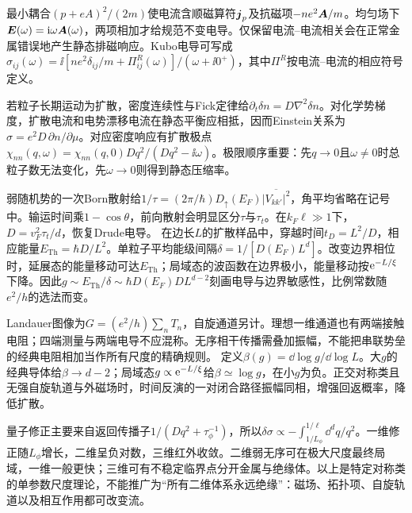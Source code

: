 \label{ch:disorder}
最小耦合$(p+eA)^2/(2m)$使电流含顺磁算符$\boldsymbol{j}_p$及抗磁项$-ne^2\boldsymbol{A}/m$。均匀场下$\boldsymbol{E}(\omega)=\mathrm i\omega\boldsymbol{A}(\omega)$，两项相加才给规范不变电导。仅保留电流--电流相关会在正常金属错误地产生静态排磁响应。Kubo电导可写成$\sigma_{ij}(\omega)=\ii[ne^2\delta_{ij}/m+\Pi^R_{ij}(\omega)]/(\omega+\ii0^+)$，其中$\Pi^R$按电流--电流的相应符号定义。

若粒子长期运动为扩散，密度连续性与Fick定律给$\partial_t\delta n=D\nabla^2\delta n$。对化学势梯度，扩散电流和电势漂移电流在静态平衡应相抵，因而Einstein关系为$\sigma=e^2D\,\partial n/\partial\mu$。对应密度响应有扩散极点$\chi_{nn}(q,\omega)=\chi_{nn}(q,0)Dq^2/(Dq^2-\ii\omega)$。极限顺序重要：先$q\to0$且$\omega\ne0$时总粒子数无法变化，先$\omega\to0$则得到静态压缩率。

弱随机势的一次Born散射给$1/\tau=(2\pi/\hbar)D_\uparrow(E_F)\overline{|V_{kk'}|^2}$，角平均省略在记号中。输运时间乘$1-\cos\theta$，前向散射会明显区分$\tau$与$\tau_t$。在$k_F\ell\gg1$下，$D=v_F^2\tau_t/d$，恢复Drude电导。
在边长$L$的扩散样品中，穿越时间$t_D=L^2/D$，相应能量$E_{\mathrm{Th}}=\hbar D/L^2$。单粒子平均能级间隔$\delta=1/[D(E_F)L^d]$。改变边界相位时，延展态的能量移动可达$E_{\mathrm{Th}}$；局域态的波函数在边界极小，能量移动按$\mathrm e^{-L/\xi}$下降。因此$g\sim E_{\mathrm{Th}}/\delta\sim\hbar D(E_F)DL^{d-2}$刻画电导与边界敏感性，比例常数随$e^2/h$的选法而变。

Landauer图像为$G=(e^2/h)\sum_nT_n$，自旋通道另计。理想一维通道也有两端接触电阻；四端测量与两端电导不应混称。无序相干传播需叠加振幅，不能把串联势垒的经典电阻相加当作所有尺度的精确规则。
定义$\beta(g)=\dd\log g/\dd\log L$。大$g$的经典导体给$\beta\to d-2$；局域态$g\propto\mathrm e^{-L/\xi}$给$\beta\simeq\log g$，在小$g$为负。正交对称类且无强自旋轨道与外磁场时，时间反演的一对闭合路径振幅同相，增强回返概率，降低扩散。

量子修正主要来自返回传播子$1/(Dq^2+\tau_\phi^{-1})$，所以$\delta\sigma\propto-\int_{1/L_\phi}^{1/\ell}\dd^dq/q^2$。一维修正随$L_\phi$增长，二维呈负对数，三维红外收敛。二维弱无序可在极大尺度最终局域，一维一般更快；三维可有不稳定临界点分开金属与绝缘体。以上是特定对称类的单参数尺度理论，不能推广为“所有二维体系永远绝缘”：磁场、拓扑项、自旋轨道以及相互作用都可改变流。

